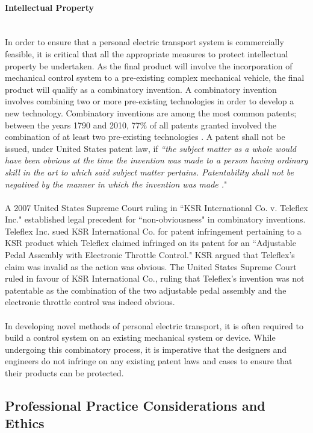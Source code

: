 \paragraph{Intellectual Property}\mbox{}\\
In order to ensure that a personal electric transport system is commercially feasible, it is critical that all the appropriate measures to protect intellectual property be undertaken. 
As the final product will involve the incorporation of mechanical control system to a pre-existing complex mechanical vehicle, the final product will qualify as a combinatory invention. 
A combinatory invention involves combining two or more pre-existing technologies in order to develop a new technology. 
Combinatory inventions are among the most common patents; between the years 1790 and 2010, 77\% of all patents granted involved the combination of at least two pre-existing technologies \cite{comblaw}.
A patent shall not be issued, under United States patent law, if \emph{“the subject matter as a whole would have been obvious at the time the invention was made to a person having ordinary skill in the art to which said subject matter pertains. 
Patentability shall not be negatived by the manner in which the invention was made \cite{NonObv}.}"  
\\
\\
A 2007 United States Supreme Court ruling in “KSR International Co. v. Teleflex Inc." established legal precedent for “non-obviousness" in combinatory inventions. 
Teleflex Inc. sued KSR International Co. for patent infringement pertaining to a KSR product which Teleflex claimed infringed on its patent for an “Adjustable Pedal Assembly with Electronic Throttle Control."
KSR argued that Teleflex's claim was invalid as the action was obvious. 
The United States Supreme Court ruled in favour of KSR International Co.,  
ruling that Teleflex's invention was not patentable as the combination of the two adjustable pedal assembly and the electronic throttle control was indeed obvious. 
\\
\\
In developing novel methods of personal electric transport, it is often required to build a control system on an existing mechanical system or device. While undergoing this combinatory process, it is imperative that the designers and engineers do not infringe on any existing patent laws and cases to ensure that their products can be protected.


\subsection{Professional Practice Considerations and Ethics}

